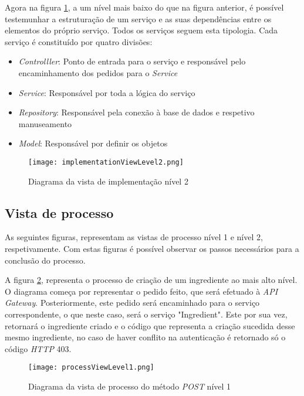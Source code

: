 Agora na figura \ref{fig:implementationView2}, a um nível mais baixo do que na figura anterior, é possível testemunhar a estruturação de um serviço e as suas dependências entre os elementos do próprio serviço. Todos os serviços seguem esta tipologia. Cada serviço é constituído por quatro divisões:
\begin{itemize}
    \item \textit{Controlller}: Ponto de entrada para o serviço e responsável pelo encaminhamento dos pedidos para o \textit{Service}
    \item \textit{Service}: Responsável por toda a lógica do serviço
    \item \textit{Repository}: Responsável pela conexão à base de dados e respetivo manuseamento
    \item \textit{Model}: Responsável por definir os objetos 
\end{itemize}


\begin{figure}[H]
    \centering
    \texttt{[image: implementationViewLevel2.png]}
    \caption{Diagrama da vista de implementação nível 2}
    \label{fig:implementationView2}
\end{figure}

\subsection{Vista de processo}

As seguintes figuras, representam as vistas de processo nível 1 e nível 2, respetivamente. Com estas figuras é possível observar os passos necessários para a conclusão do processo.

A figura \ref{fig:processView1}, representa o processo de criação de um ingrediente ao mais alto nível. O diagrama começa por representar o pedido feito, que será efetuado à \textit{API Gateway}. Posteriormente, este pedido será encaminhado para o serviço correspondente, o que neste caso, será o serviço "Ingredient". Este por sua vez, retornará o ingrediente criado e o código que representa a criação sucedida desse mesmo ingrediente, no caso de haver conflito na autenticação é retornado só o código \textit{HTTP} 403.

\begin{figure}[H]
    \centering
    \texttt{[image: processViewLevel1.png]}
    \caption{Diagrama da vista de processo do método \textit{POST} nível 1}
    \label{fig:processView1}
\end{figure}

